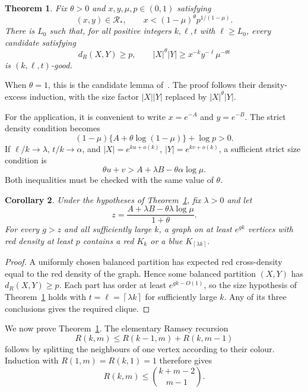 \documentclass[11pt]{article}
\newtheorem{theorem}{Theorem}[section]
\newtheorem{corollary}[theorem]{Corollary}
\theoremstyle{definition}
\theoremstyle{remark}
\newcommand{\RR}{\mathcal R}
\newcommand{\ceil}[1]{\left\lceil #1\right\rceil}
\numberwithin{equation}{section}
\begin{document}
\begin{theorem}\label{thm:weighted}
Fix $\theta>0$ and $x,y,\mu,p\in(0,1)$ satisfying
\[
 (x,y)\in\RR_*,\qquad
 x<(1-\mu)^\theta p^{1/(1-\mu)}.
\]
There is $L_0$ such that, for all positive integers $k,\ell,t$ with $\ell\ge L_0$, every candidate satisfying
\[
 d_R(X,Y)\ge p,\qquad
 |X|^\theta|Y|\ge x^{-k}y^{-\ell}\mu^{-\theta t}
\]
is $(k,\ell,t)$-good.
\end{theorem}

When $\theta=1$, this is the candidate lemma of~\cite[Lemma 12]{GNNW}.
The proof follows their density-excess induction, with the size factor
$|X||Y|$ replaced by $|X|^\theta|Y|$.

For the application, it is convenient to write $x=e^{-A}$ and $y=e^{-B}$.
The strict density condition becomes
\begin{equation}\label{eq:weighted-density}
 (1-\mu)\{A+\theta\log(1-\mu)\}+\log p>0.
\end{equation}
If $\ell/k\to\lambda$, $t/k\to\alpha$, and
$|X|=e^{ku+o(k)}$, $|Y|=e^{kv+o(k)}$, a sufficient strict size
condition is
\begin{equation}\label{eq:weighted-budget}
 \theta u+v>A+\lambda B-\theta\alpha\log\mu.
\end{equation}
Both inequalities must be checked with the same value of $\theta$.

\begin{corollary}\label{cor:weighted-density}
Under the hypotheses of Theorem~\ref{thm:weighted}, fix $\lambda>0$ and let
\[
 z=\frac{A+\lambda B-\theta\lambda\log\mu}{1+\theta}.
\]
For every $g>z$ and all sufficiently large $k$, a graph on at least $e^{gk}$ vertices with red density at least $p$ contains a red $K_k$ or a blue $K_{\ceil{\lambda k}}$.
\end{corollary}
\begin{proof}
A uniformly chosen balanced partition has expected red cross-density
equal to the red density of the graph. Hence some balanced partition
$(X,Y)$ has $d_R(X,Y)\ge p$. Each part has order at least $e^{gk-O(1)}$, so
the size hypothesis of Theorem~\ref{thm:weighted} holds with
$t=\ell=\ceil{\lambda k}$ for sufficiently large $k$. Any of its three
conclusions gives the required clique.
\end{proof}

We now prove Theorem~\ref{thm:weighted}. The elementary Ramsey recursion
\[
 R(k,m)\le R(k-1,m)+R(k,m-1)
\]
follows by splitting the neighbours of one vertex according to their colour. Induction with $R(1,m)=R(k,1)=1$ therefore gives
\begin{equation}\label{eq:binomial-Ramsey}
 R(k,m)\le\binom{k+m-2}{m-1}.
\end{equation}
\end{document}
